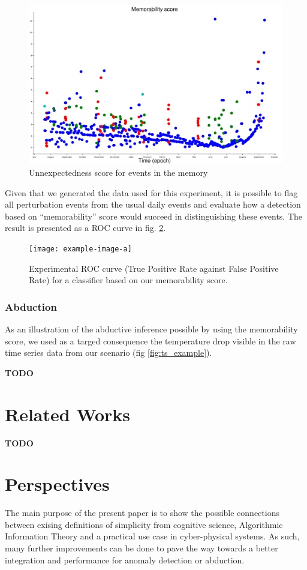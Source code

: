 \documentclass[conference]{IEEEtran}
\begin{document}
\begin{figure}[ht]
  \centering
  \includegraphics[width=\linewidth]{figures/complexities_surprises}
  \caption{Unnexpectedness score for events in the memory}
  \label{fig:result1}
\end{figure}

Given that we generated the data used for this experiment, it is possible to
flag all perturbation events from the usual daily events and evaluate how a
detection based on ``memorability'' score would succeed in distinguishing these
events. The result is presented as a ROC curve in fig. \ref{fig:roc}.

\begin{figure}[ht]
  \centering
  \texttt{[image: example-image-a]}
  \caption{Experimental ROC curve (True Positive Rate against False Positive Rate) for a
    classifier based on our memorability score.}
  \label{fig:roc}
\end{figure}
\subsubsection{Abduction}

As an illustration of the abductive inference possible by using the memorability
score, we used as a targed consequence the temperature drop visible in the raw
time series data from our scenario (fig \ref{fig:ts_example}).

\textbf{TODO}

\section{Related Works}
\label{sec:related}
\textbf{TODO}

\section{Perspectives}
\label{sec:future}
The main purpose of the present paper is to show the possible connections
between exising definitions of simplicity from cognitive science, Algorithmic
Information Theory and a practical use case in cyber-physical systems. As such,
many further improvements can be done to pave the way towards a better
integration and performance for anomaly detection or abduction.
\end{document}
